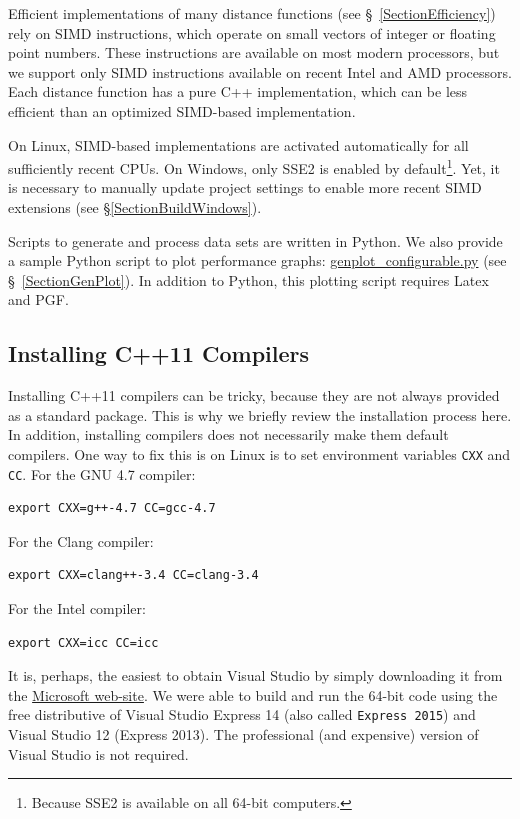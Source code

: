 \documentclass[runningheads,a4paper]{llncs}
\newcommand{\replocfile}{https://github.com/searchivarius/NonMetricSpaceLib/blob/pserv/}
\newcommand{\ttt}[1]{\texttt{#1}}
\begin{document}
{Efficient implementations of many distance functions (see \S~\ref{SectionEfficiency})
rely on SIMD instructions,
which operate on small  vectors of integer or floating point numbers. 
These instructions are available on most modern processors,
but we support only SIMD instructions available on recent Intel and AMD processors.   
Each distance function has a pure C++ implementation,
which can be less efficient than an optimized SIMD-based implementation.

On Linux, SIMD-based implementations are activated automatically 
for all sufficiently recent CPUs. 
On Windows, only SSE2 is enabled by default\footnote{Because SSE2 is available on all 64-bit computers.}. 
Yet, it is necessary to manually update project settings 
to enable more recent SIMD extensions (see \S\ref{SectionBuildWindows}).

Scripts to generate and process data sets are written in Python.
We also provide a sample Python script to plot performance graphs: \href{\replocfile sample_scripts/sample_scripts/genplot_configurable.py}{genplot\_configurable.py} (see \S~\ref{SectionGenPlot}).
In addition to Python, this plotting script requires Latex and PGF. 

\subsection{Installing C++11 Compilers}
Installing C++11 compilers can be tricky, 
because they are not always provided as a standard package.
This is why we briefly review the installation process here. 
In addition, installing compilers does 
not necessarily make them default compilers.
One way to fix this is on Linux is to set environment variables \ttt{CXX} and \ttt{CC}.
For the GNU 4.7 compiler:
\begin{verbatim}
export CXX=g++-4.7 CC=gcc-4.7 
\end{verbatim}
For the Clang compiler:
\begin{verbatim}
export CXX=clang++-3.4 CC=clang-3.4
\end{verbatim}
For the Intel compiler:
\begin{verbatim}
export CXX=icc CC=icc 
\end{verbatim}

It is, perhaps, the easiest to obtain Visual Studio by simply downloading
it from the \href{https://www.microsoft.com/en-us/download/default.aspx}{Microsoft web-site}.
We were able to build and run the 64-bit code using the free distributive of Visual Studio Express 14 (also called 
\ttt{Express 2015}) and Visual Studio 12 (Express 2013). The professional (and expensive) version of Visual Studio is not required. 


}
\end{document}
